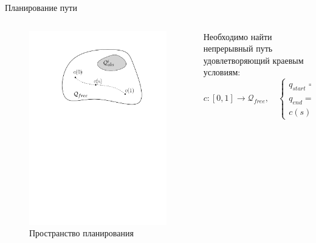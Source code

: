 \documentclass[11pt, aspectratio=169]{beamer}
\begin{document}
\begin{frame}{Планирование пути}
    \begin{columns}[onlytextwidth]
        \begin{column}{0.33\textwidth}
            \begin{figure}
                \centering
                \includegraphics[width=\textwidth]{figures/graph/configuration_space.pdf}
                \caption{Пространство планирования}
                \label{fig:my_label}
            \end{figure}
        \end{column}
        \begin{column}{0.60\textwidth}
            Необходимо найти непрерывный путь удовлетворяющий краевым условиям:
            \begin{equation}
                c : [0, 1] \rightarrow \mathcal{Q}_{free},\quad  \begin{cases}q_{start} = c(0) \in \mathcal{Q}_{free}\\ q_{end} = c(1) \in \mathcal{Q}_{free} \\  c(s)\in \mathcal{Q}_{free},\ \forall s\in[0, 1]\end{cases}

\end{equation}
\end{column}
\end{columns}
\end{frame}
\end{document}
